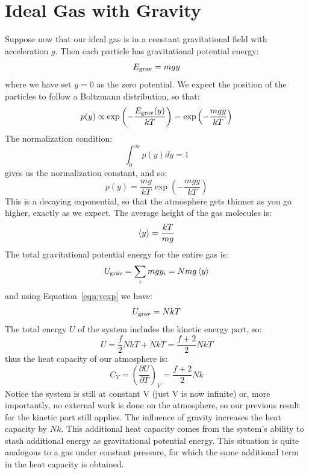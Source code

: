 \documentclass[12pt]{article}
\begin{document}
\section{Ideal Gas with Gravity}

Suppose now that our ideal gas is in a constant gravitational field with acceleration $g$.
Then each particle has gravitational potential energy:
\begin{equation}
E_{\rm grav} = m g y
\end{equation}
where we have set $y=0$ as the zero potential.  We expect the position
of the particles to follow a Boltzmann distribution, so that:
\begin{equation*}
p(y) \propto \exp\left( -\frac{E_{\rm grav}(y)}{kT} \right) = \exp\left( -\frac{m g y}{kT} \right)
\end{equation*}
The normalization condition:
$$\int_0^\infty p(y) dy = 1$$
gives us the normalization constant, and so:
\begin{equation}
\label{eqn:py}
p(y) = \frac{mg}{kT} \exp\left( -\frac{m g y}{kT} \right)
\end{equation}
This is a decaying exponential, so that the atmosphere gets thinner as you go higher, exactly as we expect.  The average height of the gas molecules is:
\begin{equation}
\label{eqn:yexp}
\braket{y} = \frac{k T }{m g}
\end{equation}
The total gravitational potential energy for the entire gas is:
$$U_{\rm grav} = \sum_i m g y_i = N m g \braket{y}$$
and using Equation~\ref{eqn:yexp} we have:
$$U_{\rm grav} = N kT$$
The total energy $U$ of the system includes the kinetic energy part, so:
\begin{equation}
U = \frac{f}{2} N k T + NkT = \frac{f+2}{2} N k T
\end{equation}
thus the heat capacity of our atmosphere is:
\begin{equation}
\label{eqn:cvg}
C_V = \left( \frac{\partial U}{\partial T} \right)_V = \frac{f+2}{2} N k
\end{equation}
Notice the system is still at constant V (just V is now infinite) or,
more importantly, no external work is done on the atmosphere, so our
previous result for the kinetic part still applies.  The influence of
gravity increases the heat capacity by $Nk$.  This additional heat
capacity comes from the system's ability to stash additional energy as
gravitational potential energy.  This situation is quite analogous to a
gas under constant pressure, for which the same additional term in the heat capacity is obtained.
\end{document}

